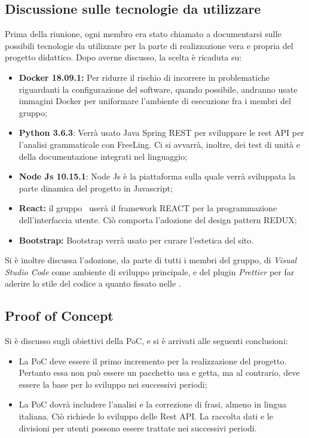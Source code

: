 \documentclass[a4paper, oneside, openany, dvipsnames, table]{article}
\begin{document}
\subsection{Discussione sulle tecnologie da utilizzare}
Prima della riunione, ogni membro era stato chiamato a documentarsi sulle possibili tecnologie da utilizzare per la parte di realizzazione vera e propria del progetto didattico. Dopo averne discusso, la scelta è ricaduta su:
\begin{itemize}
	\item \textbf{Docker 18.09.1:} Per ridurre il rischio di incorrere in problematiche riguardanti la configurazione del software, quando possibile, andranno usate immagini Docker per uniformare l'ambiente di esecuzione fra i membri del gruppo;
	\item \textbf{Python 3.6.3}: Verrà usato Java Spring REST per sviluppare le rest API per l'analisi grammaticale con FreeLing. Ci si avvarrà, inoltre, dei test di unità e della documentazione integrati nel linguaggio;
	\item \textbf{Node Js 10.15.1}: Node Js è la piattaforma sulla quale verrà sviluppata la parte dinamica del progetto in Javascript;
	\item \textbf{React:} il gruppo \gruppo \ userà il framework REACT per la programmazione dell'interfaccia utente. Ciò comporta l'adozione del design pattern REDUX;
	\item \textbf{Bootstrap:} Bootstrap verrà usato per curare l'estetica del sito.
\end{itemize}

Si è inoltre discussa l'adozione, da parte di tutti i membri del gruppo, di \textit{Visual Studio Code} come ambiente di sviluppo principale, e del plugin \textit{Prettier} per far aderire lo stile del codice a quanto fissato nelle \NdP .

\subsection{Proof of Concept}
Si è discusso sugli obiettivi della PoC, e si è arrivati alle seguenti conclusioni:
\begin{itemize}
	\item La PoC deve essere il primo incremento per la realizzazione del progetto. Pertanto essa non può essere un pacchetto usa e getta, ma al contrario, deve essere la base per lo sviluppo nei successivi periodi;
	\item La PoC dovrà includere l'analisi e la correzione di frasi, almeno in lingua italiana. Ciò richiede lo sviluppo delle Rest API. La raccolta dati e le divisioni per utenti possono essere trattate nei successivi periodi.
\end{itemize}
	
\end{document}
